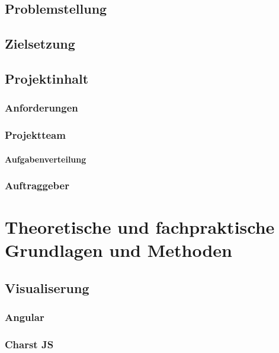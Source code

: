 \documentclass[pdftex,11pt,a4paper]{book}
\begin{document}
\section{Problemstellung}
\section{Zielsetzung}
\section{Projektinhalt}
\subsection{Anforderungen}
\subsection{Projektteam}
\subsubsection{Aufgabenverteilung}
\subsection{Auftraggeber}

\chapter{Theoretische und fachpraktische Grundlagen und Methoden}
\section{Visualiserung}
\subsection{Angular}
\subsection{Charst JS}
\end{document}
